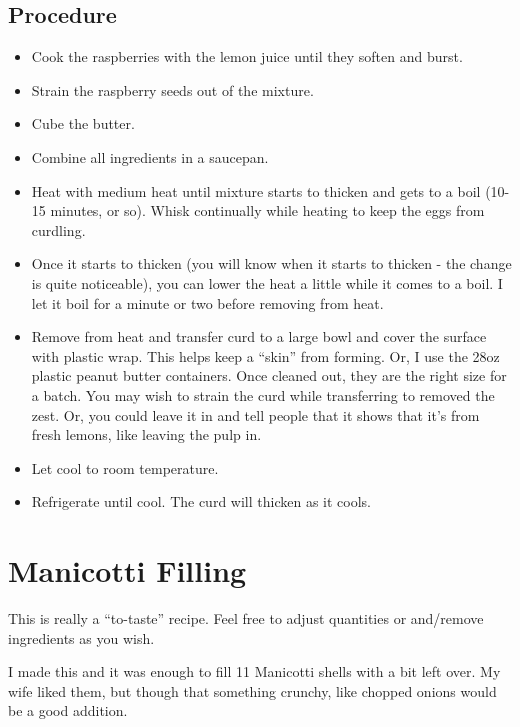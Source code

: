 \documentclass[10pt, openany]{book}
\begin{document}
\subsection{Procedure}
\begin{itemize}
  \item Cook the raspberries with the lemon juice until they soften and burst.
  \item Strain the raspberry seeds out of the mixture.
  \item Cube the butter.
  \item Combine all ingredients in a saucepan.
  \item Heat with medium heat until mixture starts to thicken and gets to a boil (10-15 minutes, or so).  Whisk continually while heating to keep the eggs from curdling.
  \item Once it starts to thicken (you will know when it starts to thicken - the change is quite noticeable), you can lower the heat a little while it comes to a boil.  I let it boil for a minute or two before removing from heat.
  \item Remove from heat and transfer curd to a large bowl and cover the surface with plastic wrap.  This helps keep a ``skin'' from forming.  Or, I use the 28oz plastic peanut butter containers.  Once cleaned out, they are the right size for a batch.  You may wish to strain the curd while transferring to removed the zest.  Or, you could leave it in and tell people that it shows that it's from fresh lemons, like leaving the pulp in.
  \item Let cool to room temperature.
  \item Refrigerate until cool.  The curd will thicken as it cools.
\end{itemize}

\section{Manicotti Filling}
\label{extra:ManicottFilling}
This is really a ``to-taste'' recipe.  Feel free to adjust quantities or and/remove ingredients as you wish.

I made this and it was enough to fill 11 Manicotti shells with a bit left over.  My wife liked them, but though that something crunchy, like chopped onions would be a good addition.
\end{document}
